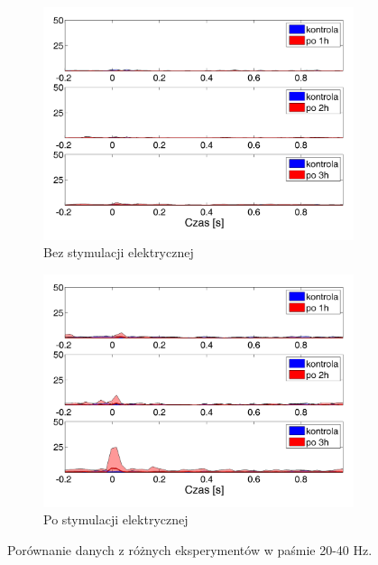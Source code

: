 \documentclass{pracamgr_2}
\begin{document}
\begin{figure}[h]
	\begin{subfigure}{.5\textwidth}
		\centering
		\includegraphics[width=1.\linewidth]{kontrola15_20-40_z_CxC8_do_LGN8.png}
		\caption{Bez stymulacji elektrycznej}
		\label{rys:20_40_kon_CxC_LGN}
	\end{subfigure}%
	\begin{subfigure}{.5\textwidth}
		\centering
		\includegraphics[width=1.\linewidth]{beta3_20-40_z_CxC5_do_LGN4.png}
		\caption{Po stymulacji elektrycznej}
		\label{rys:20_40_beta_CxC_LGN}
	\end{subfigure}
	\caption{Porównanie danych z różnych eksperymentów w paśmie 20-40 Hz.}
	\label{rys:20_40_CxC_LGN}
\end{figure}
\FloatBarrier
\end{document}

